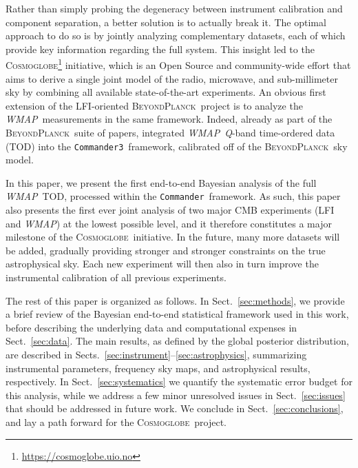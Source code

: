 \documentclass[twocolumn]{../../common/aa}
\def\WMAP{\emph{WMAP}}
\def\Planck{\emph{Planck}}
\def\commander{\texttt{Commander}}
\def\commanderthree{\texttt{Commander3}}
\newcommand{\BP}{\textsc{BeyondPlanck}}
\newcommand{\cosmoglobe}{\textsc{Cosmoglobe}}
\newcommand{\Q}[0]{\textit Q}
\begin{document}
Rather than simply probing the degeneracy between instrument calibration and component separation, a better solution is to actually break it. The optimal approach to do so is by jointly analyzing complementary datasets, each of which provide key information regarding the full system. This insight led to the \cosmoglobe\footnote{\url{https://cosmoglobe.uio.no}} initiative, which is an Open Source and community-wide effort that aims to derive a single joint model of the radio, microwave, and sub-millimeter sky by combining all available state-of-the-art experiments. An obvious first extension of the LFI-oriented \BP\ project is to analyze the \WMAP\ measurements in the same framework. Indeed, already as part of the \BP\ suite of papers, \citet{bp17} integrated \WMAP\ \Q-band time-ordered data (TOD) into the \commanderthree\ framework, calibrated off of the \BP\ sky model.

In this paper, we present the first end-to-end Bayesian analysis of the full \WMAP\ TOD, processed within the \commander\ framework. As such, this paper also presents the first ever joint analysis of two major CMB experiments (LFI and \WMAP) at the lowest possible level, and it therefore constitutes a major milestone of the \cosmoglobe\ initiative. In the future, many more datasets will be added, gradually providing stronger and stronger constraints on the true astrophysical sky. Each new experiment will then also in turn improve the instrumental calibration of all previous experiments. 

The rest of this paper is organized as follows. In Sect.~\ref{sec:methods}, we provide a brief review of the Bayesian end-to-end statistical framework used in this work, before describing the underlying data and computational expenses in Sect.~\ref{sec:data}. The main results, as defined by the global posterior distribution, are described in Sects.~\ref{sec:instrument}--\ref{sec:astrophysics}, summarizing instrumental parameters, frequency sky maps, and astrophysical results, respectively. In Sect.~\ref{sec:systematics} we quantify the systematic error budget for this analysis, while we address a few minor unresolved issues in Sect.~\ref{sec:issues} that should be addressed in future work. We conclude in Sect.~\ref{sec:conclusions}, and lay a path forward for the \cosmoglobe\ project.
\end{document}
